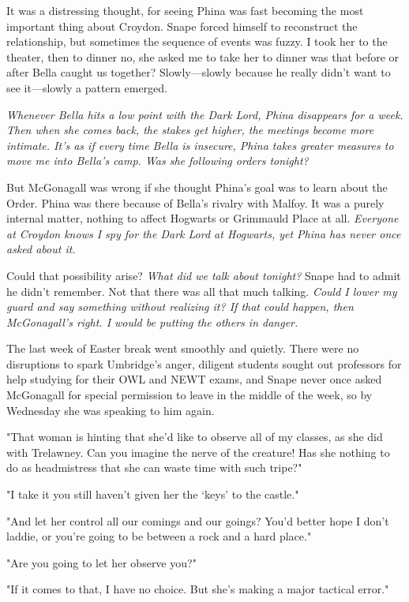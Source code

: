 It was a distressing thought, for seeing Phina was fast becoming the most important thing about Croydon. Snape forced himself to reconstruct the relationship, but sometimes the sequence of events was fuzzy. I took her to the theater, then to dinner{\el} no, she asked me to take her to dinner{\el} was that before or after Bella caught us together? Slowly—slowly because he really didn't want to see it—slowly a pattern emerged.

\emph{Whenever Bella hits a low point with the Dark Lord, Phina disappears for a week. Then when she comes back, the stakes get higher, the meetings become more intimate. It's as if every time Bella is insecure, Phina takes greater measures to move me into Bella's camp. Was she following orders tonight?}

But McGonagall was wrong if she thought Phina's goal was to learn about the Order. Phina was there because of Bella's rivalry with Malfoy. It was a purely internal matter, nothing to affect Hogwarts or Grimmauld Place at all. \emph{Everyone at Croydon knows I spy for the Dark Lord at Hogwarts, yet Phina has never once asked about it.}

Could that possibility arise? \emph{What did we talk about tonight?} Snape had to admit he didn't remember. Not that there was all that much talking. \emph{Could I lower my guard and say something without realizing it? If that could happen, then McGonagall's right. I would be putting the others in danger.}

The last week of Easter break went smoothly and quietly. There were no disruptions to spark Umbridge's anger, diligent students sought out professors for help studying for their OWL and NEWT exams, and Snape never once asked McGonagall for special permission to leave in the middle of the week, so by Wednesday she was speaking to him again.

"That woman is hinting that she'd like to observe all of my classes, as she did with Trelawney. Can you imagine the nerve of the creature! Has she nothing to do as headmistress that she can waste time with such tripe?"

"I take it you still haven't given her the `keys' to the castle."

"And let her control all our comings and our goings? You'd better hope I don't laddie, or you're going to be between a rock and a hard place."

"Are you going to let her observe you?"

"If it comes to that, I have no choice. But she's making a major tactical error."


